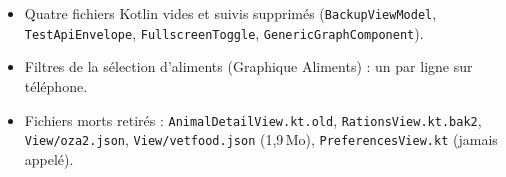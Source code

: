 \documentclass[11pt,a4paper]{article}
\newcommand{\code}[1]{\texttt{#1}}
\begin{document}
\begin{itemize}
        flux écrits mais jamais lus, champs orphelins ; vérification automatique membre par membre),
        dont une analyse complète recalculée à chaque sélection de ration sans être affichée et son
        cache LRU. \code{AnimalDetailViewModel} 2\,699\,$\to$\,2\,157 l. : référentiels et mots-clés
        délégués à \code{ReferencesConsultation}, ajout et suppression de poids factorisés,
        calculs de besoin énergétique déplacés dans \code{Data/RationAnalysisCalculations}.
        Puis 2\,157\,$\to$\,2\,037 l. : bilan des étapes du plan évolutif en fonction pure
        (\code{Data/BilanPlanEvolutif.kt}, \code{BilanEtape} sorti du ViewModel), chargement et
        calcul de l'analyse du troupeau délégués à \code{AnalyseTroupeauConsultation} ; nouveau
        test de bout en bout du troupeau (analyse du groupe, ration d'un animal d'un type,
        effectif modifié). Les actions (étapes, choix du type) restent dans le ViewModel : elles
        pilotent la ration sélectionnée et ne font qu'appeler les moteurs purs \code{PlanEvolutif}
        et \code{Troupeau}.
  \item Quatre fichiers Kotlin vides et suivis supprimés (\code{BackupViewModel},
        \code{TestApiEnvelope}, \code{FullscreenToggle}, \code{GenericGraphComponent}).
  \item Filtres de la sélection d'aliments (Graphique Aliments) : un par ligne sur téléphone.
  \item Fichiers morts retirés : \code{AnimalDetailView.kt.old}, \code{RationsView.kt.bak2},
        \code{View/oza2.json}, \code{View/vetfood.json} (1,9\,Mo), \code{PreferencesView.kt} (jamais appelé).
\end{itemize}
\end{document}
